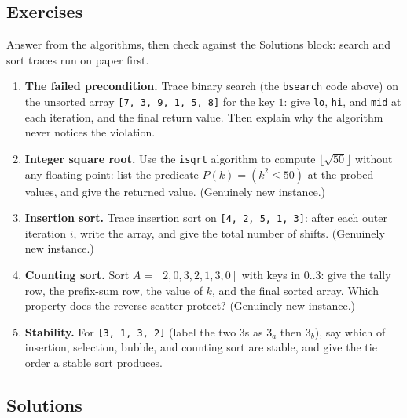 \documentclass[11pt]{article}
\begin{document}
\subsection*{Exercises}

Answer from the algorithms, then check against the Solutions block: search and sort traces run on paper first.
\begin{enumerate}
  \item \textbf{The failed precondition.} Trace binary search (the \texttt{bsearch} code above) on the unsorted array \texttt{[7, 3, 9, 1, 5, 8]} for the key $1$: give \texttt{lo}, \texttt{hi}, and \texttt{mid} at each iteration, and the final return value. Then explain why the algorithm never notices the violation.
  \item \textbf{Integer square root.} Use the \texttt{isqrt} algorithm to compute $\lfloor \sqrt{50} \rfloor$ without any floating point: list the predicate $P(k) = (k^2 \le 50)$ at the probed values, and give the returned value. (Genuinely new instance.)
  \item \textbf{Insertion sort.} Trace insertion sort on \texttt{[4, 2, 5, 1, 3]}: after each outer iteration $i$, write the array, and give the total number of shifts. (Genuinely new instance.)
  \item \textbf{Counting sort.} Sort $A = [2, 0, 3, 2, 1, 3, 0]$ with keys in $0..3$: give the tally row, the prefix-sum row, the value of $k$, and the final sorted array. Which property does the reverse scatter protect? (Genuinely new instance.)
  \item \textbf{Stability.} For \texttt{[3, 1, 3, 2]} (label the two $3$s as $3_a$ then $3_b$), say which of insertion, selection, bubble, and counting sort are stable, and give the tie order a stable sort produces.
\end{enumerate}

\subsection*{Solutions}
\end{document}
